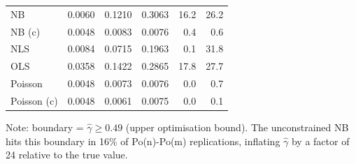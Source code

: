 \begin{table}[ht!]
\begin{tabular*}{\linewidth}{@{\extracolsep{\fill}}lrrrrr}
\midrule\addlinespace[2.5pt]
NB & 0.0060 & 0.1210 & 0.3063 & 16.2 & 26.2 \\ 
NB (c) & 0.0048 & 0.0083 & 0.0076 & 0.4 & 0.6 \\ 
NLS & 0.0084 & 0.0715 & 0.1963 & 0.1 & 31.8 \\ 
OLS & 0.0358 & 0.1422 & 0.2865 & 17.8 & 27.7 \\ 
Poisson & 0.0048 & 0.0073 & 0.0076 & 0.0 & 0.7 \\ 
Poisson (c) & 0.0048 & 0.0061 & 0.0075 & 0.0 & 0.1 \\ 
\bottomrule
\end{tabular*}
\begin{minipage}{\linewidth}
\vspace{.05em}
Note: boundary = $\hat\gamma \geq 0.49$ (upper optimisation bound). The unconstrained NB hits this boundary in 16\% of Po(n)-Po(m) replications, inflating $\hat\gamma$ by a factor of 24 relative to the true value.\\
\end{minipage}
\end{table}

